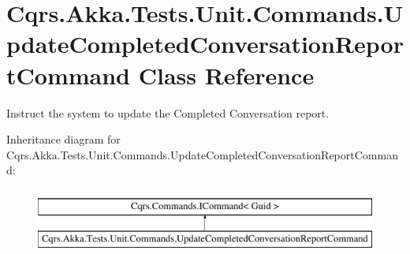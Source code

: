 \hypertarget{classCqrs_1_1Akka_1_1Tests_1_1Unit_1_1Commands_1_1UpdateCompletedConversationReportCommand}{}\section{Cqrs.\+Akka.\+Tests.\+Unit.\+Commands.\+Update\+Completed\+Conversation\+Report\+Command Class Reference}
\label{classCqrs_1_1Akka_1_1Tests_1_1Unit_1_1Commands_1_1UpdateCompletedConversationReportCommand}


Instruct the system to update the Completed Conversation report.  


Inheritance diagram for Cqrs.\+Akka.\+Tests.\+Unit.\+Commands.\+Update\+Completed\+Conversation\+Report\+Command\+:\begin{figure}[H]
\begin{center}
\leavevmode
\includegraphics[height=2.000000cm]{classCqrs_1_1Akka_1_1Tests_1_1Unit_1_1Commands_1_1UpdateCompletedConversationReportCommand}
\end{center}
\end{figure}
